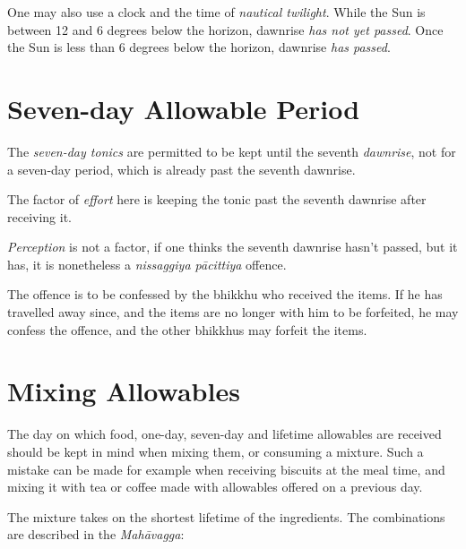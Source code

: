 One may also use a clock and the time of \emph{nautical twilight}. While the Sun
is between 12 and 6 degrees below the horizon, dawnrise \emph{has not yet
  passed}. Once the Sun is less than 6 degrees below the horizon, dawnrise
\emph{has passed}.

\section*{Seven-day Allowable Period}

The \emph{seven-day tonics} are permitted to be kept until the seventh
\emph{dawnrise}, not for a seven-day period, which is already past the seventh
dawnrise.

The factor of \emph{effort} here is keeping the tonic past the seventh dawnrise
after receiving it.

\emph{Perception} is not a factor, if one thinks the seventh dawnrise hasn't
passed, but it has, it is nonetheless a \emph{nissaggiya pācittiya} offence.

The offence is to be confessed by the bhikkhu who received the items. If he has
travelled away since, and the items are no longer with him to be forfeited, he
may confess the offence, and the other bhikkhus may forfeit the items.

\section*{Mixing Allowables}

The day on which food, one-day, seven-day and lifetime allowables are received
should be kept in mind when mixing them, or consuming a mixture. Such a mistake
can be made for example when receiving biscuits at the meal time, and mixing it
with tea or coffee made with allowables offered on a previous day.

The mixture takes on the shortest lifetime of the ingredients. 
The combinations are described in the \emph{Mahāvagga}:

\ifhandbookedition
\clearpage
\fi

